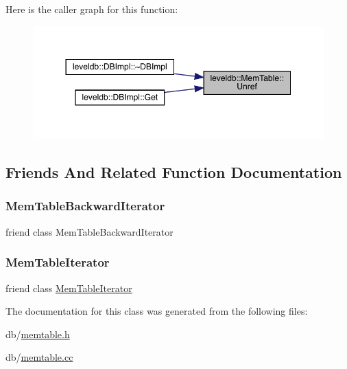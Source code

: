 Here is the caller graph for this function\+:
\nopagebreak
\begin{figure}[H]
\begin{center}
\leavevmode
\includegraphics[width=350pt]{classleveldb_1_1_mem_table_a5dcbf17d1477e6098a30dadd0745cfb2_icgraph}
\end{center}
\end{figure}


\subsection{Friends And Related Function Documentation}
\mbox{\label{classleveldb_1_1_mem_table_ab6427243fb396d56604898725f9f2327}} 
\subsubsection{\texorpdfstring{MemTableBackwardIterator}{MemTableBackwardIterator}}
{\footnotesize\ttfamily friend class Mem\+Table\+Backward\+Iterator\hspace{0.3cm}{\ttfamily [friend]}}

\mbox{\label{classleveldb_1_1_mem_table_ad6cb602bccb9af617c8cb348ae693d4a}} 
\subsubsection{\texorpdfstring{MemTableIterator}{MemTableIterator}}
{\footnotesize\ttfamily friend class \mbox{\hyperlink{classleveldb_1_1_mem_table_iterator}{Mem\+Table\+Iterator}}\hspace{0.3cm}{\ttfamily [friend]}}



The documentation for this class was generated from the following files\+:\begin{DoxyCompactItemize}
\item 
db/\mbox{\hyperlink{memtable_8h}{memtable.\+h}}\item 
db/\mbox{\hyperlink{memtable_8cc}{memtable.\+cc}}\end{DoxyCompactItemize}
